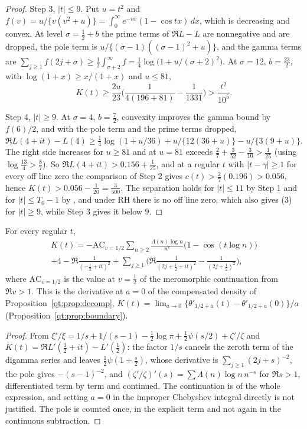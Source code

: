 \begin{proof}
Step 3, $|t|\le9$. Put $u=t^2$ and $f(v)=u/\{v(v^2+u)\}=\int_0^\infty e^{-vx}(1-\cos tx)\,dx$, which is decreasing and convex. At level $\sigma=\tfrac12+b$ the prime terms of $\Re L-L$ are nonnegative and are dropped, the pole term is $u/\{(\sigma-1)((\sigma-1)^2+u)\}$, and the gamma terms are $\sum_{j\ge1}f(2j+\sigma)\ge\tfrac12\int_{\sigma+2}^\infty f=\tfrac14\log\big(1+u/(\sigma+2)^2\big)$. At $\sigma=12$, $b=\tfrac{23}2$, with $\log(1+x)\ge x/(1+x)$ and $u\le81$,
\[
K(t)\ge\frac{2u}{23}\Big(\frac1{4(196+81)}-\frac1{1331}\Big)>\frac{t^2}{10^5}.
\]

Step 4, $|t|\ge9$. At $\sigma=4$, $b=\tfrac72$, convexity improves the gamma bound by $f(6)/2$, and with the pole term and the prime terms dropped, $\Re L(4+it)-L(4)\ge\tfrac14\log(1+u/36)+u/\{12(36+u)\}-u/\{3(9+u)\}$. The right side increases for $u\ge81$ and at $u=81$ exceeds $\tfrac27+\tfrac3{52}-\tfrac3{10}>\tfrac1{25}$ (using $\log\tfrac{13}4>\tfrac87$). So $\Re L(4+it)>0.156+\tfrac1{25}$, and at a regular $t$ with $|t-\gamma|\ge1$ for every off line zero the comparison of Step 2 gives $c(t)>\tfrac27(0.196)>0.056$, hence $K(t)>0.056-\tfrac1{20}=\tfrac3{500}$. The separation holds for $|t|\le11$ by Step 1 and for $|t|\le T_0-1$ by \cite{PT21}, and under RH there is no off line zero, which also gives (3) for $|t|\ge9$, while Step 3 gives it below $9$.
\end{proof}

\begin{proposition}\label{qt:prop:curvprime}
For every regular $t$,
\begin{multline*}
K(t)=-\mathrm{AC}_{v=1/2}\sum_{n\ge2}\frac{\Lambda(n)\log n}{n^v}\big(1-\cos(t\log n)\big)\\+4-\Re\frac1{(-\tfrac12+it)^2}+\sum_{j\ge1}\Big(\Re\frac1{(2j+\tfrac12+it)^2}-\frac1{(2j+\tfrac12)^2}\Big),
\end{multline*}
where $\mathrm{AC}_{v=1/2}$ is the value at $v=\tfrac12$ of the meromorphic continuation from $\Re v>1$. This is the derivative at $a=0$ of the compensated density of Proposition~\ref{qt:prop:decomp}, $K(t)=\lim_{a\to0}\{\theta'_{1/2+a}(t)-\theta'_{1/2+a}(0)\}/a$ (Proposition~\ref{qt:prop:boundary}).
\end{proposition}

\begin{proof}
From $\xi'/\xi=1/s+1/(s-1)-\tfrac12\log\pi+\tfrac12\psi(s/2)+\zeta'/\zeta$ and $K(t)=\Re L'(\tfrac12+it)-L'(\tfrac12)$: the factor $1/s$ cancels the zeroth term of the digamma series and leaves $\tfrac12\psi(1+\tfrac s2)$, whose derivative is $\sum_{j\ge1}(2j+s)^{-2}$, the pole gives $-(s-1)^{-2}$, and $(\zeta'/\zeta)'(s)=\sum\Lambda(n)\log n\,n^{-s}$ for $\Re s>1$, differentiated term by term and continued. The continuation is of the whole expression, and setting $a=0$ in the improper Chebyshev integral directly is not justified. The pole is counted once, in the explicit term and not again in the continuous subtraction.
\end{proof}

